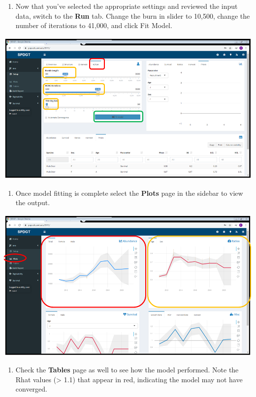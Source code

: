 \documentclass[
]{book}
\providecommand{\tightlist}{%
  \setlength{\itemsep}{0pt}\setlength{\parskip}{0pt}}
\begin{document}
\begin{enumerate}
\def\labelenumi{\arabic{enumi}.}
\setcounter{enumi}{8}
\tightlist
\item
  Now that you've selected the appropriate settings and reviewed the input data, switch to the \textbf{Run} tab. Change the burn in slider to 10,500, change the number of iterations to 41,000, and click {Fit Model}.
\end{enumerate}

\includegraphics{./www/ipm_08.PNG}

\begin{enumerate}
\def\labelenumi{\arabic{enumi}.}
\setcounter{enumi}{9}
\tightlist
\item
  Once model fitting is complete select the \textbf{Plots} page in the sidebar to view the output.
\end{enumerate}

\includegraphics{./www/ipm_09.PNG}

\begin{enumerate}
\def\labelenumi{\arabic{enumi}.}
\setcounter{enumi}{10}
\tightlist
\item
  Check the \textbf{Tables} page as well to see how the model performed. Note the Rhat values (\textgreater{} 1.1) that appear in red, indicating the model may not have converged.
\end{enumerate}
\end{document}
